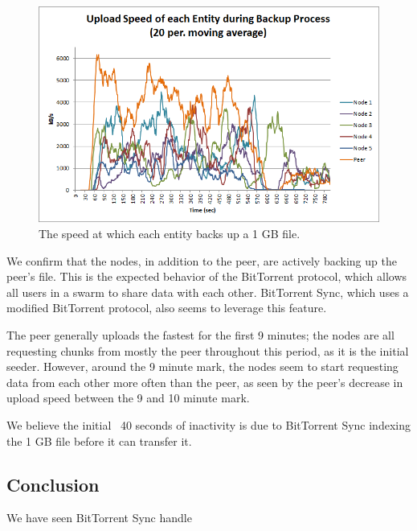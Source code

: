 \documentclass[12pt]{report}
\begin{document}
\begin{figure}
  \centerline{\includegraphics[scale=1]{figures/EntityBackupSpeed}}
  \caption{The speed at which each entity backs up a 1 GB file. \label{fig:EntityBackupSpeed}}
\end{figure}

We confirm that the nodes, in addition to the peer, are actively backing up the peer's file. This is the expected behavior of the BitTorrent protocol, which allows all users in a swarm to share data with each other. BitTorrent Sync, which uses a modified BitTorrent protocol, also seems to leverage this feature.

The peer generally uploads the fastest for the first 9 minutes; the nodes are all requesting chunks from mostly the peer throughout this period, as it is the initial seeder. However, around the 9 minute mark, the nodes seem to start requesting data from each other more often than the peer, as seen by the peer's decrease in upload speed between the 9 and 10 minute mark.


We believe the initial ~40 seconds of inactivity is due to BitTorrent Sync indexing the 1 GB file before it can transfer it.

\subsection{Conclusion}

We have seen BitTorrent Sync handle 
\end{document}
